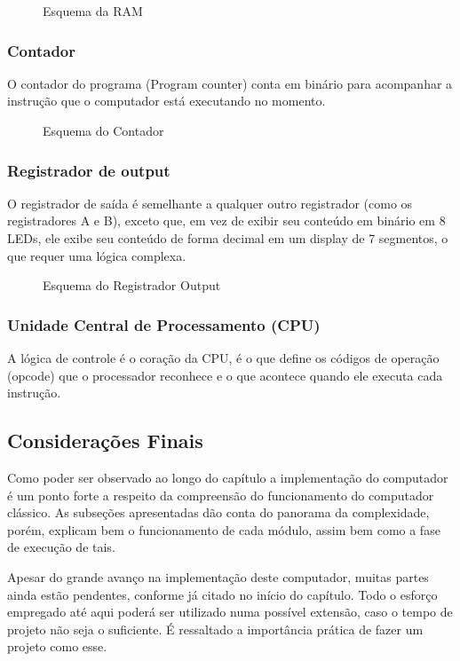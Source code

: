 \vspace{1cm}
\begin{figure}[H] \centering 
  \caption{\label{schematics_ram} Esquema da RAM} 
\end{figure}

\subsubsection{Contador}
O contador do programa (Program counter) conta em binário para acompanhar a instrução que o computador está executando no momento.

\vspace{1cm}
\begin{figure}[H] \centering 
  \caption{\label{schematics_pc} Esquema do Contador} 
\end{figure}

\subsubsection{Registrador de output}
O registrador de saída é semelhante a qualquer outro registrador (como os registradores A e B), exceto que, em vez de exibir seu conteúdo em binário em 8 LEDs, ele exibe seu conteúdo de forma decimal em um display de 7 segmentos, o que requer uma lógica complexa.

\vspace{1cm}
\begin{figure}[H] \centering 
  \caption{\label{schematics_output} Esquema do Registrador Output} 
\end{figure}

\subsubsection{Unidade Central de Processamento (CPU)}
A lógica de controle é o coração da CPU, é o que define os códigos de operação (opcode) que o processador reconhece e o que acontece quando ele executa cada instrução.

\subsection{Considerações Finais}

Como poder ser observado ao longo do capítulo a implementação do computador é um ponto forte a respeito da compreensão do funcionamento do computador clássico. As subseções apresentadas dão conta do panorama da complexidade, porém, explicam bem o funcionamento de cada módulo, assim bem como a fase de execução de tais.

Apesar do grande avanço na implementação deste computador, muitas partes ainda estão pendentes, conforme já citado no início do capítulo. Todo o esforço empregado até aqui poderá ser utilizado numa possível extensão, caso o tempo de projeto não seja o suficiente. É ressaltado a importância prática de fazer um projeto como esse.


\newpage


